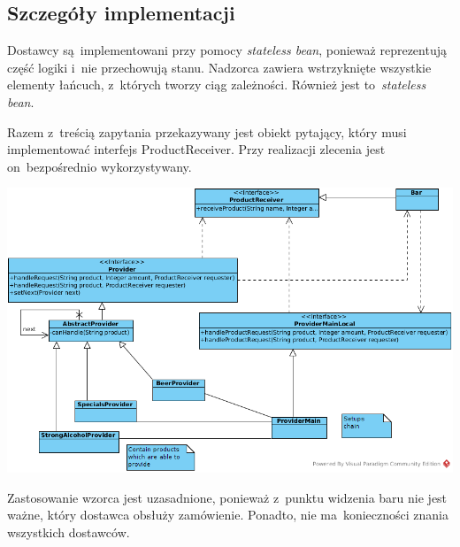\documentclass[11pt]{aghdpl}
\begin{document}
\subsection{Szczegóły implementacji}
Dostawcy są~implementowani przy pomocy \textit{stateless bean}, ponieważ reprezentują część logiki i~nie przechowują stanu. Nadzorca zawiera wstrzyknięte wszystkie elementy łańcuch, z~których tworzy ciąg zależności. Również jest to~\textit{stateless bean}.

Razem z~treścią zapytania przekazywany jest obiekt pytający, który musi implementować interfejs ProductReceiver. Przy realizacji zlecenia jest on~bezpośrednio wykorzystywany.
\begin{center}
 \includegraphics[width=16cm]{chain}
\end{center}

Zastosowanie wzorca jest uzasadnione, ponieważ z~punktu widzenia baru nie jest ważne, który dostawca obsłuży zamówienie. Ponadto, nie ma~konieczności znania wszystkich dostawców.
\end{document}
